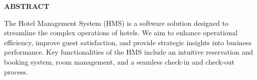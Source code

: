 \begin{center}
    \Large \textbf{\uppercase{Abstract}}
\end{center}
\vspace{1\baselineskip}
\noindent
The Hotel Management System (HMS) is a software solution designed to streamline the complex operations of hotels. We aim to enhance operational efficiency, improve guest satisfaction, and provide strategic insights into business performance. Key functionalities of the HMS include an intuitive reservation and booking system, room management, and a seamless check-in and check-out process.